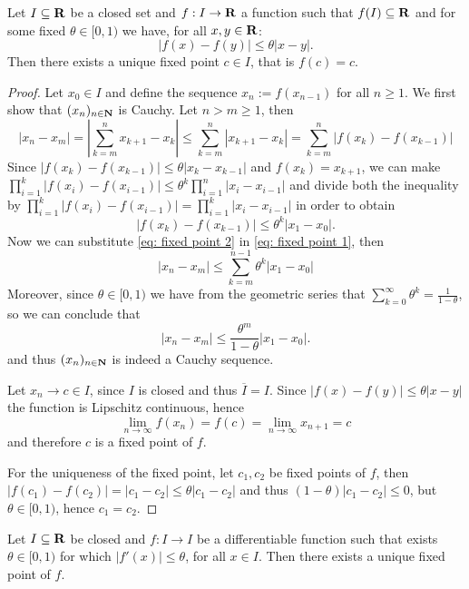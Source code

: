 \begin{theorem}\label{thm: fixed point}
Let \(I \subseteq \mathbf{R}\) be a closed set and \(f: I \to \mathbf{R}\) a
function such that \(f(I) \subseteq \mathbf{R}\) and for some fixed \(\theta
\in [0, 1)\) we have, for all \(x, y \in \mathbf{R}\):
\[
|f(x) - f(y)| \leq \theta |x - y|.
\]
Then there exists a unique fixed point \(c \in I\), that is \(f(c) = c\).
\end{theorem}

\begin{proof}
Let \(x_0 \in I\) and define the sequence \(x_n := f(x_{n-1})\) for all \(n
\geq 1\). We first show that \((x_n)_{n \in \mathbf{N}}\) is Cauchy. Let \(n >
m \geq 1\), then
\begin{equation}\label{eq: fixed point 1}
|x_n - x_m| = \left| \sum_{k=m}^n x_{k+1} - x_k \right|
\leq \sum_{k=m}^n |x_{k+1} - x_k| = \sum_{k=m}^n |f(x_k) - f(x_{k-1})|
\end{equation}
Since \(|f(x_k) - f(x_{k-1})| \leq \theta |x_k - x_{k-1}|\) and \(f(x_k) =
x_{k+1}\), we can make  \(\prod_{i=1}^k |f(x_i) - f(x_{i-1})| \leq \theta^k
\prod_{i=1}^n |x_i - x_{i-1}|\) and divide both the inequality by
\(\prod_{i=1}^k |f(x_i) - f(x_{i-1})| = \prod_{i=1}^k |x_i - x_{i-1}|\) in
order to obtain
\begin{equation}\label{eq: fixed point 2}
|f(x_k) - f(x_{k-1})| \leq \theta^k |x_1 - x_0|.
\end{equation}
Now we can substitute \cref{eq: fixed point 2} in \cref{eq: fixed point 1},
then
\[
|x_n - x_m| \leq \sum_{k=m}^{n-1} \theta^k |x_1 - x_0|
\]
Moreover, since \(\theta \in [0, 1)\) we have from the geometric series that
\(\sum_{k=0}^\infty \theta^k = \frac{1}{1-\theta}\), so we can conclude that
\[
|x_n - x_m| \leq \frac{\theta^m}{1 - \theta} |x_1 - x_0|.
\]
and thus \((x_n)_{n \in \mathbf{N}}\) is indeed a Cauchy sequence.

Let \(x_n \to c \in I\), since \(I\) is closed and thus \(\overline I = I\).
Since \(|f(x) - f(y)| \leq \theta |x - y|\) the function is Lipschitz
continuous, hence
\[
\lim_{n \to \infty} f(x_n) = f(c) = \lim_{n \to \infty} x_{n+1} = c
\]
and therefore \(c\) is a fixed point of \(f\).

For the uniqueness of the fixed point, let \(c_1, c_2\) be fixed points of
\(f\), then \(|f(c_1) - f(c_2)| = |c_1 - c_2| \leq \theta |c_1 - c_2|\) and
thus \((1 - \theta)|c_1 - c_2| \leq 0\), but \(\theta \in [0, 1)\), hence
\(c_1 = c_2\).
\end{proof}

\begin{corollary}
Let \(I \subseteq \mathbf{R}\) be closed and \(f : I \to I\) be a
differentiable function such that exists \(\theta \in [0, 1)\) for which
\(|f'(x)| \leq \theta\), for all \(x \in I\). Then there exists a unique fixed
point of \(f\).
\end{corollary}

